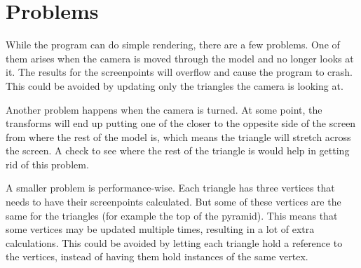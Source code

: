 \section{Problems}
\label{04}

While the program can do simple rendering, there are a few problems. One of them arises when the camera is moved through the model and no longer looks at it. The results for the screenpoints will overflow and cause the program to crash. This could be avoided by updating only the triangles the camera is looking at.

Another problem happens when the camera is turned. At some point, the transforms will end up putting one of the closer to the oppesite side of the screen from where the rest of the model is, which means the triangle will stretch across the screen. A check to see where the rest of the triangle is would help in getting rid of this problem.

A smaller problem is performance-wise. Each triangle has three vertices that needs to have their screenpoints calculated. But some of these vertices are the same for the triangles (for example the top of the pyramid). This means that some vertices may be updated multiple times, resulting in a lot of extra calculations. This could be avoided by letting each triangle hold a reference to the vertices, instead of having them hold instances of the same vertex.